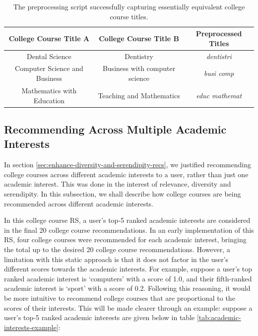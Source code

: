 \begin{table}[H]
\centering
\begin{tabular}{|c|c|c|}
\hline
\textbf{College Course Title A} & \textbf{College Course Title B} & \textbf{Preprocessed Titles}\\
\hline
Dental Science & Dentistry & \emph{dentistri}\\
\hline
Computer Science and Business & Business with computer science & \emph{busi comp}\\
\hline
Mathematics with Education & Teaching and Mathematics & \emph{educ mathemat}\\
\hline
\end{tabular}
\caption{The preprocessing script successfully capturing essentially equivalent college course titles.}
\label{tab:string-examples-2}
\end{table}

\subsection{Recommending Across Multiple Academic Interests}
\label{sec:multiple-academic-interests-impl}

In section \ref{sec:enhance-diversity-and-serendipity-recs},
we justified recommending college courses across different academic interests to a user,
rather than just one academic interest.
This was done in the interest of relevance, diversity and serendipity.
In this subsection, we shall describe how college courses are being recommended across different academic interests.

In this college course RS, a user's top-5 ranked academic interests are considered
in the final 20 college course recommendations.
In an early implementation of this RS, 
four college courses were recommended for each academic interest,
bringing the total up to the desired 20 college course recommendations.
However, a limitation with this static approach is that it does not factor in the user's different scores towards the academic interests.
For example, suppose a user's top ranked academic interest is `computers' with a score of 1.0, 
and their fifth-ranked academic interest is `sport' with a score of 0.2.
Following this reasoning, it would be more intuitive to recommend college courses that are proportional to the scores of their interests.
This will be made clearer through an example: suppose a user's top-5 ranked academic interests are given below in table \ref{tab:academic-interests-example}:

